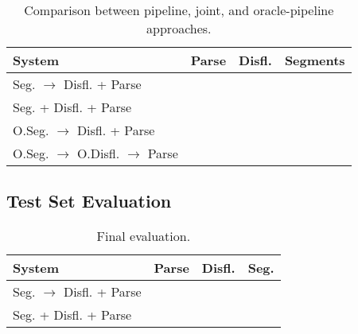 \documentclass[11pt,letterpaper]{article}
\begin{document}
\begin{table}
    \centering
    \small
    \begin{tabular}{l|rrr}
        System & Parse & Disfl. & Segments \\
        \hline \hline
        Seg. $\rightarrow$ Disfl. + Parse & & & \\
        Seg. + Disfl. + Parse  & & & \\
        \hline
        O.Seg. $\rightarrow$ Disfl. + Parse & & & \\
        O.Seg. $\rightarrow$ O.Disfl. $\rightarrow$ Parse & & & \\
        \hline

    \end{tabular}
    \caption{\small Comparison between pipeline, joint, and oracle-pipeline
             approaches.}
\end{table}


\subsection{Test Set Evaluation}

\begin{table}
    \centering
    \small
    \begin{tabular}{l|rrr}
        System & Parse & Disfl. & Seg. \\
        \hline \hline
        Seg. $\rightarrow$ Disfl. + Parse & & & \\
        Seg. + Disfl. + Parse  & & & \\
    \end{tabular}
    \caption{\small Final evaluation.}
\end{table}





\end{document}

